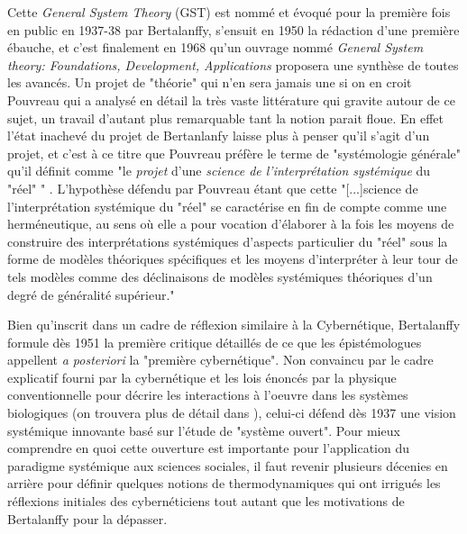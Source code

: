 Cette \textit{General System Theory} (GST) est nommé et évoqué pour la première fois en public en 1937-38 par Bertalanffy, s'ensuit en 1950 la rédaction d'une première ébauche, et c'est finalement en 1968 qu'un ouvrage nommé \textit{General System theory: Foundations, Development, Applications} proposera une synthèse de toutes les avancés. Un projet de "théorie" qui n'en sera jamais une si on en croit Pouvreau \autocite{Pouvreau2013} qui a analysé en détail la très vaste littérature qui gravite autour de ce sujet, un travail d'autant plus remarquable tant la notion parait floue. En effet l'état inachevé du projet de Bertanlanfy  laisse plus à penser qu'il s'agit d'un projet, et c'est à ce titre que Pouvreau préfère le terme de "systémologie générale" qu'il définit comme "le \textit{projet} d'une \textit{science de l'interprétation systémique} du "réel" " \autocite[9]{Pouvreau2013}. L'hypothèse défendu par Pouvreau étant que cette "[...]science de l'interprétation systémique du "réel" se caractérise en fin de compte comme une herméneutique, au sens où elle a pour vocation d'élaborer à la fois les moyens de construire des interprétations systémiques d'aspects particulier du "réel" sous la forme de modèles théoriques spécifiques et les moyens d'interpréter à leur tour de tels modèles comme des déclinaisons de modèles systémiques théoriques d'un degré de généralité supérieur."\autocite[9-10]{Pouvreau2013}

Bien qu'inscrit dans un cadre de réflexion similaire à la Cybernétique, Bertalanffy formule dès 1951 la première critique détaillés de ce que les épistémologues appellent \textit{a posteriori} la "première cybernétique". Non convaincu par le cadre explicatif fourni par la cybernétique et les lois énoncés par la physique conventionnelle pour décrire les interactions à l'oeuvre dans les systèmes biologiques (on trouvera plus de détail dans \autocite[787-789]{Pouvreau2013}), celui-ci défend dès 1937 une vision systémique innovante basé sur l'étude de "système ouvert". Pour mieux comprendre en quoi cette ouverture est importante pour l'application du paradigme systémique aux sciences sociales, il faut revenir plusieurs décenies en arrière pour définir quelques notions de thermodynamiques qui ont irrigués les réflexions initiales des cybernéticiens tout autant que les motivations de Bertalanffy pour la dépasser.

